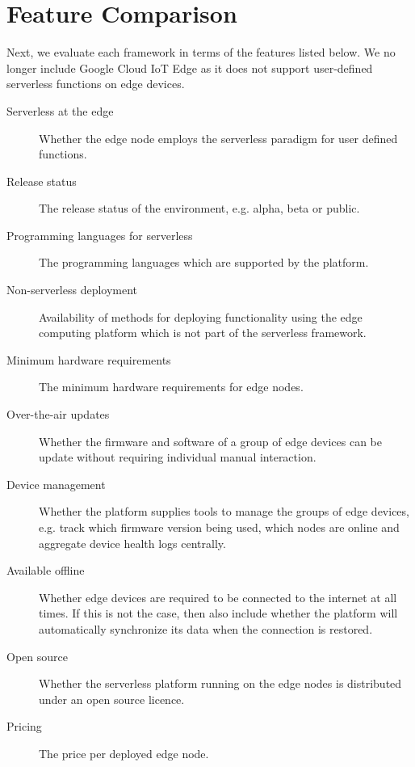 \documentclass[article]{aaltoseries}
\begin{document}
\section{Feature Comparison}\label{sec:feature-comparison}
Next, we evaluate each framework in terms of the features listed below. We no longer include Google Cloud IoT Edge as it does not support user-defined serverless functions on edge devices.

\begin{description}
    \item[Serverless at the edge] Whether the edge node employs the serverless paradigm for user defined functions.
    \item[Release status] The release status of the environment, e.g. alpha, beta or public.
    \item[Programming languages for serverless] The programming languages which are supported by the platform.
    \item[Non-serverless deployment] Availability of methods for deploying functionality using the edge computing platform which is not part of the serverless framework.
    \item[Minimum hardware requirements] The minimum hardware requirements for edge nodes.
    \item[Over-the-air updates] Whether the firmware and software of a group of edge devices can be update without requiring individual manual interaction.
    \item[Device management] Whether the platform supplies tools to manage the groups of edge devices, e.g. track which firmware version being used, which nodes are online and aggregate device health logs centrally.
    \item[Available offline] Whether edge devices are required to be connected to the internet at all times. If this is not the case, then also include whether the platform will automatically synchronize its data when the connection is restored.
    \item[Open source] Whether the serverless platform running on the edge nodes is distributed under an open source licence.
    \item[Pricing] The price per deployed edge node.
\end{description}
\end{document}
